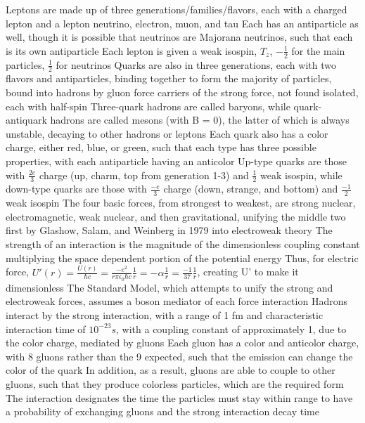 \documentclass[11 pt, twoside]{article}
\newenvironment{outline*}
{
	\begin{outline}[enumerate]
	}
	{\end{outline}
}
\begin{document}
\begin{outline*}
		\3 Leptons are made up of three generations/families/flavors, each with a charged lepton and a lepton neutrino, electron, muon, and tau
			\4 Each has an antiparticle as well, though it is possible that neutrinos are Majorana neutrinos, such that each is its own antiparticle
			\4 Each lepton is given a weak isospin, $T_z$, $-\frac{1}{2}$ for the main particles, $\frac{1}{2}$ for neutrinos
		\3 Quarks are also in three generations, each with two flavors and antiparticles, binding together to form the majority of particles, bound into hadrons by gluon force carriers of the strong force, not found isolated, each with half-spin
			\4 Three-quark hadrons are called baryons, while quark-antiquark hadrons are called mesons (with B = 0), the latter of which is always unstable, decaying to other hadrons or leptons
			\4 Each quark also has a color charge, either red, blue, or green, such that each type has three possible properties, with each antiparticle having an anticolor
			\4 Up-type quarks are those with $\frac{2e}{3}$ charge (up, charm, top from generation 1-3) and $\frac{1}{2}$ weak isospin, while down-type quarks are those with $\frac{-e}{3}$ charge (down, strange, and bottom) and $\frac{-1}{2}$ weak isospin
\1 The four basic forces, from strongest to weakest, are strong nuclear, electromagnetic, weak nuclear, and then gravitational, unifying the middle two first by Glashow, Salam, and Weinberg in 1979 into electroweak theory
	\2 The strength of an interaction is the magnitude of the dimensionless coupling constant multiplying the space dependent portion of the potential energy
		\3 Thus, for electric force, $U'(r) = \frac{U(r)}{\hbar c} = \frac{-e^2}{r\pi\epsilon_0 \hbar c}\frac{1}{r} = -\alpha\frac{1}{r} = \frac{-1}{37}\frac{1}{r}$, creating U' to make it dimensionless
	\2 The Standard Model, which attempts to unify the strong and electroweak forces, assumes a boson mediator of each force interaction
	\2 Hadrons interact by the strong interaction, with a range of 1 fm and characteristic interaction time of $10^{-23} s$, with a coupling constant of approximately 1, due to the color charge, mediated by gluons
		\3 Each gluon has a color and anticolor charge, with 8 gluons rather than the 9 expected, such that the emission can change the color of the quark
			\4 In addition, as a result, gluons are able to couple to other gluons, such that they produce colorless particles, which are the required form
		\3 The interaction designates the time the particles must stay within range to have a probability of exchanging gluons and the strong interaction decay time

\end{outline*}
\end{document}
